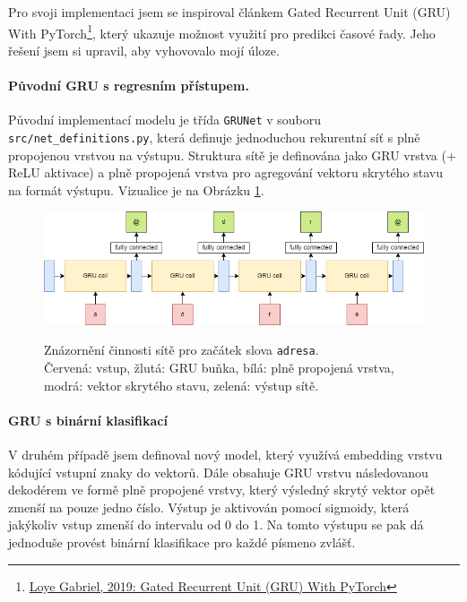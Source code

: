 \documentclass[a4paper]{article}
\theoremstyle{definition}
\begin{document}
Pro svoji implementaci jsem se inspiroval článkem Gated Recurrent Unit (GRU) With PyTorch\footnote{\href{https://blog.floydhub.com/gru-with-pytorch/}{Loye Gabriel, 2019: Gated Recurrent Unit (GRU) With PyTorch}}, který ukazuje možnost využití pro predikci časové řady. Jeho řešení jsem si upravil, aby vyhovovalo mojí úloze.

\paragraph{Původní GRU s regresním přístupem.}
Původní implementací modelu je třída \texttt{GRUNet} v souboru \texttt{src/net\_definitions.py}, která definuje jednoduchou rekurentní síť s plně propojenou vrstvou na výstupu. Struktura sítě je definována jako GRU vrstva (+ ReLU aktivace) a plně propojená vrstva pro agregování vektoru skrytého stavu na formát výstupu. Vizualice je na Obrázku \ref{png:gru_old_adresa}.

\begin{figure}[t!]
  \centering
  \includegraphics[width=4.5in]{gru_diagram_adresa.png}\\[1pt]  %
  \caption{Znázornění činnosti sítě pro začátek slova \texttt{adresa}.\\Červená: vstup, žlutá: GRU buňka, bílá: plně propojená vrstva, modrá: vektor skrytého stavu, zelená: výstup sítě.}
  \label{png:gru_old_adresa}
\end{figure}

\paragraph{GRU s binární klasifikací}
V druhém případě jsem definoval nový model, který využívá embedding vrstvu kódující vstupní znaky do vektorů. Dále obsahuje GRU vrstvu následovanou dekodérem ve formě plně propojené vrstvy, který výsledný skrytý vektor opět zmenší na pouze jedno číslo. Výstup je aktivován pomocí sigmoidy, která jakýkoliv vstup zmenší do intervalu od 0 do 1. Na tomto výstupu se pak dá jednoduše provést binární klasifikace pro každé písmeno zvlášť.
\end{document}
